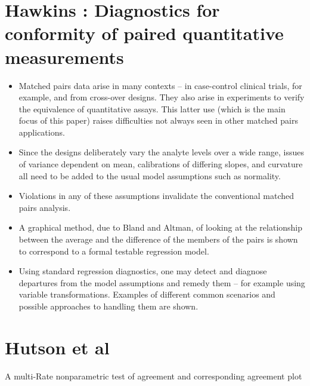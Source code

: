 \documentclass[12pt, a4paper]{report}
\theoremstyle{plain}
\theoremstyle{definition}
\theoremstyle{remark}
\begin{document}

\section{Hawkins : Diagnostics for conformity of paired quantitative measurements}

\begin{itemize}
	\item Matched pairs data arise in many contexts – in case-control clinical trials, for example, and from cross-over designs. They also arise in experiments to verify the equivalence of quantitative assays. This latter use (which is the main focus of this paper) raises difficulties not always seen in other matched pairs applications. 
	
	\item Since the designs deliberately vary the analyte levels over a wide range, issues of variance dependent on mean, calibrations of differing slopes, and curvature all need to be added to the usual model assumptions such as normality. 
	
	\item Violations in any of these assumptions invalidate the conventional matched pairs analysis. 
	
	\item A graphical method, due to Bland and Altman, of looking at the relationship between the average and the difference of the members of the pairs is shown to correspond to a formal testable regression model. 
	
	\item Using standard regression diagnostics, one may detect and diagnose departures from the model assumptions and remedy them – for example using variable transformations. Examples of different common scenarios and possible approaches to handling them are shown.
\end{itemize}



\section{Hutson et al}
A multi-Rate nonparametric test of agreement and corresponding agreement plot
\end{document}
